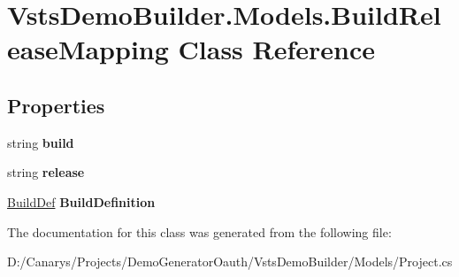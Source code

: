 \hypertarget{class_vsts_demo_builder_1_1_models_1_1_build_release_mapping}{}\section{Vsts\+Demo\+Builder.\+Models.\+Build\+Release\+Mapping Class Reference}
\label{class_vsts_demo_builder_1_1_models_1_1_build_release_mapping}
\subsection*{Properties}
\begin{DoxyCompactItemize}
\item 
\mbox{\label{class_vsts_demo_builder_1_1_models_1_1_build_release_mapping_a4a7df09fd712be9a530363224bd72de2}} 
string {\bfseries build}
\item 
\mbox{\label{class_vsts_demo_builder_1_1_models_1_1_build_release_mapping_a09afd04f6453408c133562fbdb91d85a}} 
string {\bfseries release}
\item 
\mbox{\label{class_vsts_demo_builder_1_1_models_1_1_build_release_mapping_abc048f76f984b52ded47927a0786ae7a}} 
\mbox{\hyperlink{class_vsts_demo_builder_1_1_models_1_1_build_def}{Build\+Def}} {\bfseries Build\+Definition}
\end{DoxyCompactItemize}


The documentation for this class was generated from the following file\+:\begin{DoxyCompactItemize}
\item 
D\+:/\+Canarys/\+Projects/\+Demo\+Generator\+Oauth/\+Vsts\+Demo\+Builder/\+Models/Project.\+cs\end{DoxyCompactItemize}

